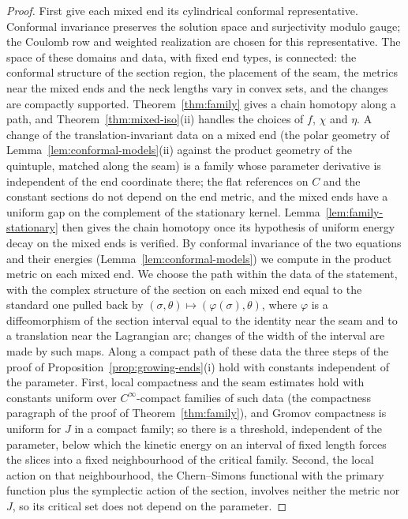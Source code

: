\documentclass[11pt]{amsart}
\theoremstyle{definition}
\theoremstyle{remark}
\theoremstyle{plain}
\numberwithin{equation}{section}
\begin{document}
\begin{proof}
First give each mixed end its cylindrical conformal representative.
Conformal invariance preserves the solution space and surjectivity
modulo gauge; the Coulomb row and weighted realization are chosen
for this representative. The space of these domains and data,
with fixed end types, is connected: the
conformal structure of the section region, the placement of the seam, the
metrics near the mixed ends and the neck lengths vary in convex sets, and the
changes are compactly supported. Theorem~\ref{thm:family} gives a chain
homotopy along a path, and Theorem~\ref{thm:mixed-iso}(ii) handles the choices
of $f$, $\chi$ and $\eta$. A change of the translation-invariant data on a mixed
end (the polar geometry of Lemma~\ref{lem:conformal-models}(ii) against the
product geometry of the quintuple, matched along the seam) is a family whose
parameter derivative is independent of the end coordinate there; the flat
references on $C$ and the constant sections do not depend on the end metric,
and the mixed ends have a uniform gap on the complement of the stationary
kernel. Lemma~\ref{lem:family-stationary} then gives the chain homotopy once its
hypothesis of uniform energy decay on the mixed ends is verified. By conformal
invariance of the two equations and their energies (Lemma~\ref{lem:conformal-models})
we compute in the product metric on each mixed end. We choose the path
within the data of the statement, with the complex structure of the section on each
mixed end equal to the standard one pulled back by $(\sigma,\theta)\mapsto(\varphi(\sigma),\theta)$,
where $\varphi$ is a diffeomorphism of the section interval equal to the identity near the
seam and to a translation near the Lagrangian arc; changes of the width of the interval
are made by such maps. Along a compact path of these data the three steps of the proof
of Proposition~\ref{prop:growing-ends}(i) hold with constants independent of the
parameter. First, local compactness and the seam estimates hold with constants
uniform over $C^\infty$-compact families of such data (the compactness paragraph of the
proof of Theorem~\ref{thm:family}), and Gromov compactness is uniform for $J$ in a
compact family; so there is a threshold, independent of the parameter, below which the
kinetic energy on an interval of fixed length forces the slices into a fixed neighbourhood
of the critical family. Second, the local action on that neighbourhood, the Chern--Simons
functional with the primary function plus the symplectic action of the section,
involves neither the metric nor $J$, so its critical set does not depend on the parameter.

\end{proof}
\end{document}
